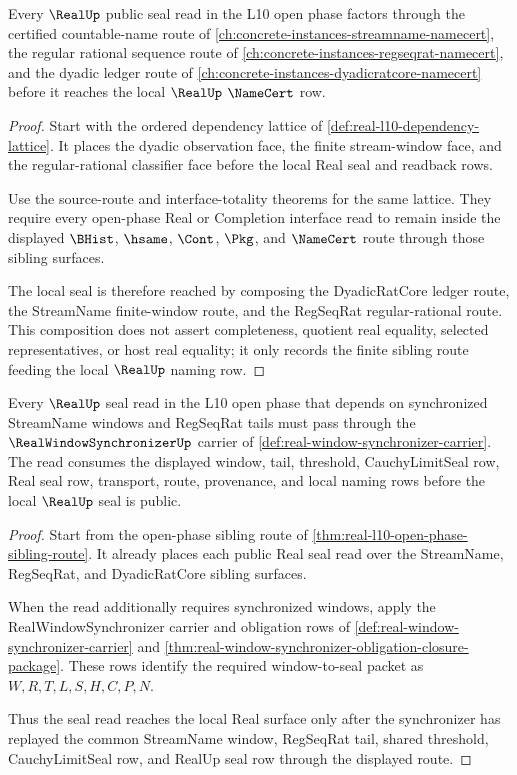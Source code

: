 \begin{theorem}
\label{thm:real-l10-open-phase-sibling-route}
Every $\RealUp$ public seal read in the L10 open phase factors through the certified countable-name route of \autoref{ch:concrete-instances-streamname-namecert}, the regular rational sequence route of \autoref{ch:concrete-instances-regseqrat-namecert}, and the dyadic ledger route of \autoref{ch:concrete-instances-dyadicratcore-namecert} before it reaches the local $\RealUp$ $\NameCert$ row.
\end{theorem}
\begin{proof}
Start with the ordered dependency lattice of \autoref{def:real-l10-dependency-lattice}. It places the dyadic observation face, the finite stream-window face, and the regular-rational classifier face before the local Real seal and readback rows.

Use the source-route and interface-totality theorems for the same lattice. They require every open-phase Real or Completion interface read to remain inside the displayed $\BHist$, $\hsame$, $\Cont$, $\Pkg$, and $\NameCert$ route through those sibling surfaces.

The local seal is therefore reached by composing the DyadicRatCore ledger route, the StreamName finite-window route, and the RegSeqRat regular-rational route. This composition does not assert completeness, quotient real equality, selected representatives, or host real equality; it only records the finite sibling route feeding the local $\RealUp$ naming row.
\end{proof}

\begin{theorem}
\label{thm:real-window-synchronizer-seal-dependency}
Every $\RealUp$ seal read in the L10 open phase that depends on synchronized StreamName windows and RegSeqRat tails must pass through the $\RealWindowSynchronizerUp$ carrier of \autoref{def:real-window-synchronizer-carrier}. The read consumes the displayed window, tail, threshold, CauchyLimitSeal row, Real seal row, transport, route, provenance, and local naming rows before the local $\RealUp$ seal is public.
\end{theorem}
\begin{proof}
Start from the open-phase sibling route of \autoref{thm:real-l10-open-phase-sibling-route}. It already places each public Real seal read over the StreamName, RegSeqRat, and DyadicRatCore sibling surfaces.

When the read additionally requires synchronized windows, apply the RealWindowSynchronizer carrier and obligation rows of \autoref{def:real-window-synchronizer-carrier} and \autoref{thm:real-window-synchronizer-obligation-closure-package}. These rows identify the required window-to-seal packet as $W,R,T,L,S,H,C,P,N$.

Thus the seal read reaches the local Real surface only after the synchronizer has replayed the common StreamName window, RegSeqRat tail, shared threshold, CauchyLimitSeal row, and RealUp seal row through the displayed route.
\end{proof}

